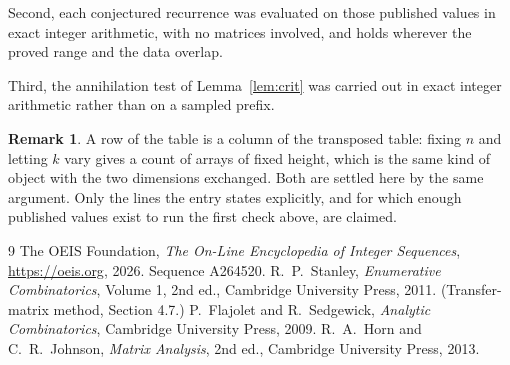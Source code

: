 \documentclass[11pt,a4paper]{article}
\theoremstyle{plain}
\theoremstyle{definition}
\newtheorem{remark}[theorem]{Remark}
\begin{document}
Second, each conjectured recurrence was evaluated on those published values in exact
integer arithmetic, with no matrices involved, and holds wherever the proved range and the
data overlap.

Third, the annihilation test of Lemma~\ref{lem:crit} was carried out in exact integer
arithmetic rather than on a sampled prefix.

\begin{remark}
A row of the table is a column of the transposed table: fixing $n$ and letting $k$ vary gives a
count of arrays of fixed height, which is the same kind of object with the two dimensions
exchanged. Both are settled here by the same argument. Only the lines the entry states
explicitly, and for which enough published values exist to run the first check above, are
claimed.
\end{remark}

\begin{thebibliography}{9}
 The OEIS Foundation, \emph{The On-Line Encyclopedia of Integer
Sequences}, \url{https://oeis.org}, 2026. Sequence A264520.
 R.~P.~Stanley, \emph{Enumerative Combinatorics}, Volume 1, 2nd ed.,
Cambridge University Press, 2011. (Transfer-matrix method, Section 4.7.)
 P.~Flajolet and R.~Sedgewick, \emph{Analytic Combinatorics}, Cambridge
University Press, 2009.
 R.~A.~Horn and C.~R.~Johnson, \emph{Matrix Analysis}, 2nd ed., Cambridge
University Press, 2013.
\end{thebibliography}
\end{document}
